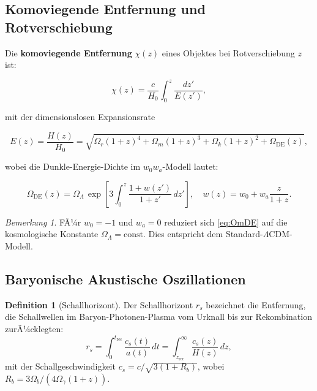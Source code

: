 ﻿\documentclass[a4paper,12pt]{article}
\theoremstyle{definition}
\newtheorem{definition}{Definition}[section]
\theoremstyle{remark}
\newtheorem{bemerkung}{Bemerkung}[section]
\begin{document}
\subsection{Komoviegende Entfernung und Rotverschiebung}

Die \textbf{komoviegende Entfernung} $\chi(z)$ eines Objektes bei
Rotverschiebung $z$ ist:

\begin{equation}
  \label{eq:chi}
  \chi(z) = \frac{c}{H_0}\int_0^z \frac{dz'}{E(z')},
\end{equation}

mit der dimensionslosen Expansionsrate

\begin{equation}
  \label{eq:Ez}
  E(z) = \frac{H(z)}{H_0}
       = \sqrt{\Omega_r(1+z)^4 + \Omega_m(1+z)^3 + \Omega_k(1+z)^2 + \Omega_\mathrm{DE}(z)},
\end{equation}

wobei die Dunkle-Energie-Dichte im $w_0 w_a$-Modell lautet:

\begin{equation}
  \label{eq:OmDE}
  \Omega_\mathrm{DE}(z) = \Omega_\Lambda\,\exp\!\left[3\int_0^z
    \frac{1 + w(z')}{1+z'}\,dz'\right],\quad
  w(z) = w_0 + w_a\frac{z}{1+z}.
\end{equation}

\begin{bemerkung}
  FÃ¼r $w_0 = -1$ und $w_a = 0$ reduziert sich \eqref{eq:OmDE} auf die
  kosmologische Konstante $\Omega_\Lambda = \text{const}$. Dies entspricht dem
  Standard-$\Lambda$CDM-Modell.
\end{bemerkung}

\subsection{Baryonische Akustische Oszillationen}

\begin{definition}[Schallhorizont]
  Der Schallhorizont $r_s$ bezeichnet die Entfernung, die Schallwellen im
  Baryon-Photonen-Plasma vom Urknall bis zur Rekombination zurÃ¼cklegten:
  \begin{equation}
    \label{eq:rs}
    r_s = \int_0^{t_\mathrm{rec}} \frac{c_s(t)}{a(t)}\,dt
        = \int_{z_\mathrm{rec}}^\infty \frac{c_s(z)}{H(z)}\,dz,
  \end{equation}
  mit der Schallgeschwindigkeit $c_s = c/\sqrt{3(1+R_b)}$, wobei
  $R_b = 3\Omega_b/(4\Omega_\gamma(1+z))$.
\end{definition}
\end{document}
